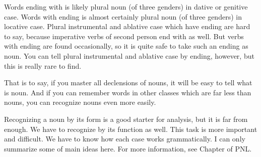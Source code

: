 Words ending with  is likely plural noun (of three genders) in dative or genitive case. Words with  ending is almost certainly plural noun (of three genders) in locative case. Plural instrumental and ablative case which have  ending are hard to say, because imperative verbs of second person end with  as well. But verbs with  ending are found occasionally, so it is quite safe to take such an ending as noun. You can tell plural instrumental and ablative case by  ending, however, but this is really rare to find.

That is to say, if you master all declensions of nouns, it will be easy to tell what is noun. And if you can remember words in other classes which are far less than nouns, you can recognize nouns even more easily.

Recognizing a noun by its form is a good starter for analysis, but it is far from enough. We have to recognize by its function as well. This task is more important and difficult. We have to know how each case works grammatically. I can only summarize some of main ideas here. For more information, see Chapter  of PNL.

